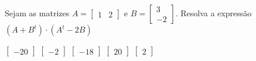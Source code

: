 Sejam as matrizes $A = \left[ \begin{array}{cc}
1 & 2
\end{array} \right]$ e $B = \left[ \begin{array}{c}
3 \\ -2
\end{array} \right]$. Resolva a expressão $\left( A+B^t \right)\cdot \left( A^t-2B \right)$

$\left[ \begin{array}{c} -20 \end{array} \right]$
$\left[ \begin{array}{c} -2 \end{array} \right]$
$\left[ \begin{array}{c} -18 \end{array} \right]$
$\left[ \begin{array}{c} 20 \end{array} \right]$
$\left[ \begin{array}{c} 2 \end{array} \right]$


